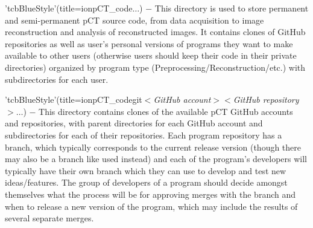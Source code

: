 \begin{tcbfunctionenv}
\begin{tcbparagraph}
\end{tcbparagraph}
\begin{tcbparagraph}'tcbBlueStyle'(title=\dirsep ion\dirsep pCT\_code\dirsep $\dots$)
$\boldsymbol{-}$ This directory is used to store permanent and semi-permanent pCT source code, from data acquisition to image reconstruction and analysis of reconstructed images.  It contains clones of GitHub repositories as well as user's personal versions of programs they want to make available to other users (otherwise users should keep their code in their private directories) organized by program type (Preprocessing/Reconstruction/etc.) with subdirectories for each user.
\end{tcbparagraph}
\begin{tcbparagraph}'tcbBlueStyle'(title=\dirsep ion\dirsep pCT\_code\dirsep git\dirsep $<$\emph{GitHub account}$>$\dirsep $<$\emph{GitHub repository}$>$\dirsep $\dots$)
$\boldsymbol{-}$ This directory contains clones of the available pCT GitHub accounts and repositories, with parent directories for each GitHub account and subdirectories for each of their repositories.  Each program repository has a  branch, which typically corresponds to the current release version (though there may also be a branch like  used instead) and each of the program's developers will typically have their own branch which they can use to develop and test new ideas/features.  The group of developers of a program should decide amongst themselves what the process will be for approving merges with the  branch and when to release a new version of the program, which may include the results of several separate merges.\\[\tcbparskip]


\end{tcbparagraph}
\end{tcbfunctionenv}
